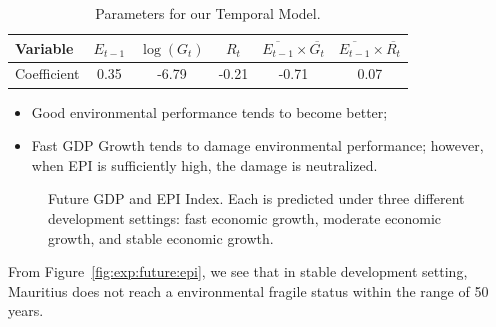     \begin{table}[htbp]
        \centering
        \begin{tabular}{|l|ccccc|} \hline
            Variable & $E_{t-1}$ & $\log(G_t)$ & $R_t$ & $\overline{E_{t-1}}\times\overline{G_t}$ & $\overline{E_{t-1}}\times\overline{R_t}$
            \\ \hline
            Coefficient & 0.35 & -6.79 & -0.21 & -0.71 & 0.07 
            \\ \hline
        \end{tabular}
        \caption{Parameters for our Temporal Model.}
        \label{tab:exp:temporal:params}
    \end{table}
    \begin{itemize}
       \item Good environmental performance tends to become better;
       \item Fast GDP Growth tends to damage environmental performance; however, when EPI is sufficiently high, the damage is neutralized.
    \end{itemize}


\begin{figure}[htbp]
    \centering
    \caption{Future GDP and EPI Index. Each is predicted under three different development settings: fast economic growth, moderate economic growth, and stable economic growth.}
    \label{fig:exp:future}
\end{figure}

From Figure~\ref{fig:exp:future:epi}, we see that in stable development setting, Mauritius does not reach a environmental fragile status within the range of 50 years.

